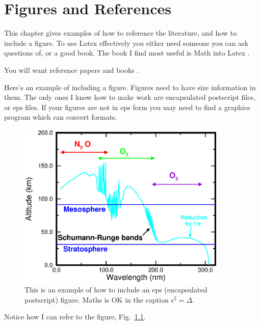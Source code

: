\setcounter{page}{1}  %

\chapter{Figures and References}

This chapter gives examples of how to reference the literature, and how to include a figure. To use Latex effectively you either need someone you can ask questions of, or a good book. The book I find most useful is Math into Latex \cite{math into latex}.

You will want reference papers \cite{unruh} and books \cite{pethick}.

Here's an example of including a figure. Figures need to have size information in them. The only ones I know how to make work are encapsulated postscript files, or eps files. If your figures are not in eps form you may need to find a graphics program which can convert formats.
\begin{figure}
  \begin{center}  %
    \includegraphics[width=10cm]{fig1.eps}
  \end{center}
\caption{This is an example of how to include an eps (encapsulated postscript) figure. Maths is OK in the caption $\epsilon^2 =\Delta$. }
\label{some text as a figure label}
\end{figure}
%
Notice how I can refer to the figure, Fig.~\ref{some text as a figure label}. 
